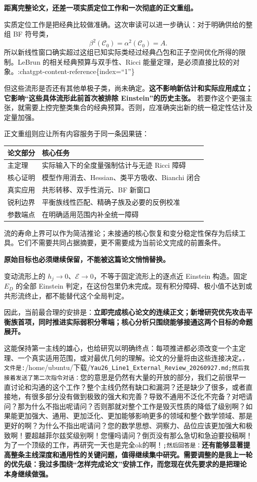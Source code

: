\documentclass[
  10pt,
]{article}
\begin{document}
\textbf{距离完整论文，还差一项实质定位工作和一次彻底的正文重组。}

实质定位工作是把经典比较做准确。这次审读可以进一步确认：对于明确供给的整组
BF 符号类， \[
\beta^2(\mathcal C_0)=\alpha^2(\mathcal C_0)=A.
\]
所以新线性窗口确实超过这组已知实际类经过经典凸包和正子空间优化所得的限制。LeBrun
的相关经典预算与双手性、Ricci
能量定理，是必须直接比较的对象。:chatgpt-content-reference\{index=``1''\}

但这些流形是否还有其他单极子类，尚未确定。\textbf{这不影响新估计和实际应用成立；它影响``这些具体流形此前首次被排除
Einstein''的历史主张。}
若要作这个更强主张，就需要上控完整类集合的经典预算。否则，应准确突出新的统一稳定性估计及定量加强。

正文重组则应让所有内容服务于同一条因果链：

\begin{longtable}[]{@{}>{\raggedright\arraybackslash}p{\dimexpr(\linewidth-2\tabcolsep)/2\relax}>{\raggedright\arraybackslash}p{\dimexpr(\linewidth-2\tabcolsep)/2\relax}@{}}
\toprule
论文部分 & 核心任务\tabularnewline
\midrule
\endhead
主定理 & 实际输入下的全度量强制估计与无迹 Ricci 障碍\tabularnewline
核心证明 & 模型作用消去、Hessian、类平方吸收、Bianchi
闭合\tabularnewline
真实应用 & 共形转移、双手性消元、BF 新窗口\tabularnewline
锐利边界 & 平衡族线性匹配、精确子族及必要的反例校准\tabularnewline
参数端点 & 在明确适用范围内补全统一障碍\tabularnewline
\bottomrule
\end{longtable}

流的寿命上界可以作为简洁推论；未接通的核心恢复和变分稳定性保存为后续工具。它们不需要共同占据摘要，更不需要成为当前论文完成的前置条件。

\textbf{原始目标也必须继续保留，不能被这篇论文悄悄替换。}

变动流形上的 \(h_j\to0\)、\(\mathcal E\to0\)，不等于固定流形上的逐点近
Einstein 构造。固定 \(E_D\) 的全部 Einstein
判定，在这份包里仍未完成。现有积分障碍、极小值不达到或共形流终止，都不能替代这个全局判定。

因此，当前最合理的安排是：\textbf{立即完成核心论文的连续正文；新增研究优先攻击平衡族首项，同时推进实际弱积分零端；核心分析只围绕能够接通这两个目标的命题展开。}

这能保持第一主线的雄心，也给研究以明确终点：每项推进都必须改变一个主定理、一个真实适用范围，或对最优几何的理解。论文的分量将由这些连接决定。\texttt{，文件是:}/home/ubuntu/下载/\nolinkurl{Yau26_Line1_External_Review_20260927.md}\texttt{;然后我接着发送了第二次指令对话：}您的意思是仍然有大量的开放的部分，我们之前很早一直讨论和沟通的这个工作？整个主线仍然有缺口和漏洞？还是缺少了很多，或者直接地，有很多部分没有做到极致的强大和完善？导致不通用不泛化不完备？对吧请问？那为什么不指出呢请问？否则那就对整个工作是毁灭性质的降低了级别啊？如果能更加强大、通用、更加泛化、更加能够影响更多的领域和整个数学领域、那是更好的啊？为什么不指出呢请问？您的数学思想、洞察力、品位应该更加强大和极致啊！要超越菲尔兹奖级别啊！您懂吗请问？倒页没有那么急切和急迫要投稿啊！为了一个顶级的工作，再研究一天也是完全ok的啊！\texttt{;然后回答是：}\textbf{还有能够显著提高整条主线深度和通用性的关键问题，值得继续集中研究。需要调整的是我上一轮的优先级：我过多围绕``怎样完成论文''安排工作，而您现在优先要求的是把理论本身继续做强。}
\end{document}
